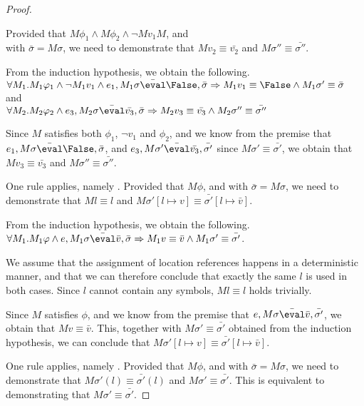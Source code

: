 \begin{proof}
{{    }
    {Provided that $M\phi_1 \land M\phi_2 \land \lnot M v_1 M$, and\\
     with $\bar{\sigma}=M \sigma$,
    we need to demonstrate that $M v_2 \equiv \bar{v_2}$ and $M \sigma''\equiv\bar{\sigma''}$.

    From the induction hypothesis, we obtain the following.\\
    $\forall M_1 .M_1 \phi_1 \land\lnot M_1 v_1 \land e_1,M_1 \sigma \bar{\eval}\False,\bar{\sigma}\implies M_1 v_1 \equiv \False \land M_1\sigma' \equiv\bar{\sigma}$ and\\
    $\forall M_2 . M_2 \phi_2 \wedge e_3,M_2 \sigma \bar{\eval}\bar{v_3},\bar{\sigma}\implies M_2 v_3\equiv \bar{v_3} \land M_2\sigma''\equiv\bar{\sigma''}$

    Since $M$ satisfies both $\phi_1$, $\lnot v_1$ and $\phi_2$,
    and we know from the premise that $e_1,M\sigma \bar{\eval}\False,\bar{\sigma}$,
    and $e_3,M\sigma' \bar{\eval}\bar{v_3},\bar{\sigma'}$ since $M\sigma' \equiv \bar{\sigma'}$,
    we obtain that $M v_3 \equiv \bar{v_3}$ and $M \sigma'' \equiv\bar{\sigma''}$.

    }
  }

  {One rule applies, namely .
  Provided that $M\phi$, and  with $\bar{\sigma}=M\sigma$,
  we need to demonstrate that $M l \equiv l$ and $M\sigma'[l\mapsto v]\equiv\bar{\sigma'}[l\mapsto\bar{v}]$.

  From the induction hypothesis, we obtain the following. $\forall M_1 .  M_1\phi \wedge e, M_1\sigma \bar{\eval}\bar{v},\bar{\sigma}\implies  M_1v\equiv \bar{v} \wedge  M_1\sigma'\equiv\bar{\sigma'}$.

  We assume that the assignment of location references happens in a deterministic manner, and that we can therefore conclude that exactly the same $l$ is used in both cases. Since $l$ cannot contain any symbols, $M l \equiv l$ holds trivially.

  Since $M$ satisfies $\phi$,
  and we know from the premise that $e,M\sigma \bar{\eval}\bar{v},\bar{\sigma'}$,
  we obtain that $M v\equiv \bar{v}$.
  This, together with $M \sigma' \equiv\bar{\sigma'}$ obtained from the induction hypothesis, we can conclude that $M\sigma'[l\mapsto v]\equiv\bar{\sigma'}[l\mapsto\bar{v}]$.
  }

  {One rule applies, namely .
  Provided that $M\phi$, and  with $\bar{\sigma}=M\sigma$,
  we need to demonstrate that $M \sigma'(l) \equiv \bar{\sigma'}(l)$ and $M\sigma'\equiv\bar{\sigma'}$.
  This is equivalent to demonstrating that $M\sigma'\equiv\bar{\sigma'}$.

}
\end{proof}
